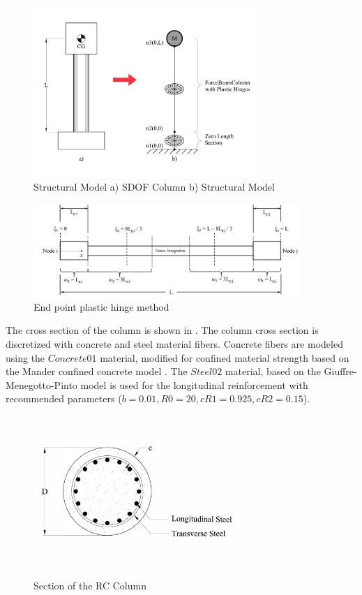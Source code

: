 \begin{figure}[htbp]
	\centering
	\includegraphics[width=0.75\textwidth]{Chapter-5/figs/StructuralModel_01}
	\caption{Structural Model a) SDOF Column b) Structural Model}
	\label{fig:Structural_Model}
\end{figure}

\begin{figure}[htbp]
	\centering
	\includegraphics[width=0.9\textwidth]{Chapter-5/figs/fbc_PlasticHinge}
	\caption{End point plastic hinge method \cite{Scott}}
	\label{fig:Fiber_PlasticHinge}
\end{figure}

The cross section of the column is shown in . The column cross section is discretized with concrete and steel material fibers. Concrete fibers are modeled using the $Concrete01$ material, modified for confined material strength based on the Mander confined concrete model \cite{Mander1988}. The $Steel02$ material, based on the Giuffre-Menegotto-Pinto model \cite{Filippou1983} is used for the longitudinal reinforcement with recommended parameters ($b = 0.01, R0 = 20, cR1 = 0.925, cR2 = 0.15$). 

\begin{figure}[htbp]
	\centering
	\includegraphics[width=0.7\textwidth]{Chapter-5/figs/StructuralModel_Section}
	\caption{Section of the RC Column}
	\label{fig:ColumnSection}
\end{figure}
